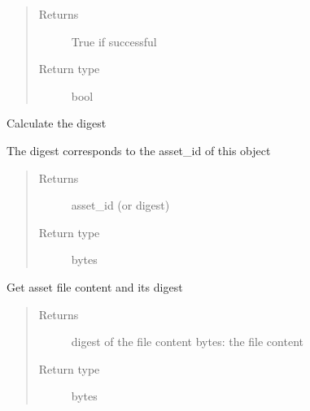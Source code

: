 \documentclass[letterpaper,10pt,english]{sphinxmanual}
\begin{document}
\begin{fulllineitems}
\begin{fulllineitems}
\begin{quote}
\begin{description}
\item[{Returns}] \leavevmode
True if successful

\item[{Return type}] \leavevmode
bool

\end{description}\end{quote}

\end{fulllineitems}


\begin{fulllineitems}
\label{\detokenize{bbc1.core.bbclib:bbc1.core.bbclib.BBcAsset.digest}}
Calculate the digest

The digest corresponds to the asset\_id of this object
\begin{quote}\begin{description}
\item[{Returns}] \leavevmode
asset\_id (or digest)

\item[{Return type}] \leavevmode
bytes

\end{description}\end{quote}

\end{fulllineitems}


\begin{fulllineitems}
\label{\detokenize{bbc1.core.bbclib:bbc1.core.bbclib.BBcAsset.get_asset_file}}
Get asset file content and its digest
\begin{quote}\begin{description}
\item[{Returns}] \leavevmode
digest of the file content
bytes: the file content

\item[{Return type}] \leavevmode
bytes

\end{description}\end{quote}

\end{fulllineitems}



\end{fulllineitems}
\end{document}

